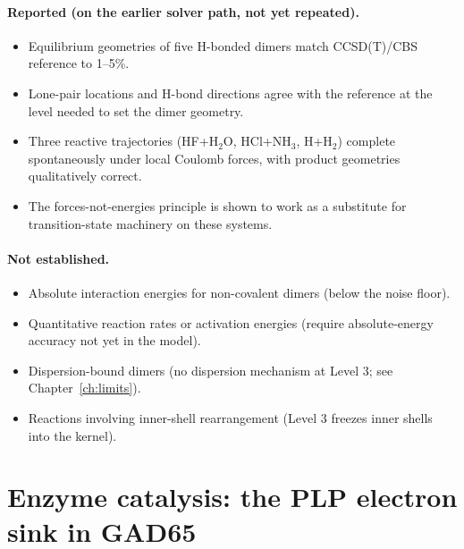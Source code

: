 \paragraph{Reported (on the earlier solver path, not yet repeated).}
\begin{itemize}
\item Equilibrium geometries of five H-bonded dimers match CCSD(T)/CBS reference to 1--5\%.
\item Lone-pair locations and H-bond directions agree with the reference at the level needed to set the dimer geometry.
\item Three reactive trajectories (HF+H$_2$O, HCl+NH$_3$, H+H$_2$) complete spontaneously under local Coulomb forces, with product geometries qualitatively correct.
\item The forces-not-energies principle is shown to work as a substitute for transition-state machinery on these systems.
\end{itemize}

\paragraph{Not established.}
\begin{itemize}
\item Absolute interaction energies for non-covalent dimers (below the noise floor).
\item Quantitative reaction rates or activation energies (require absolute-energy accuracy not yet in the model).
\item Dispersion-bound dimers (no dispersion mechanism at Level 3; see Chapter~\ref{ch:limits}).
\item Reactions involving inner-shell rearrangement (Level 3 freezes inner shells into the kernel).
\end{itemize}

\section{Enzyme catalysis: the PLP electron sink in GAD65}\label{sec:gad65}

